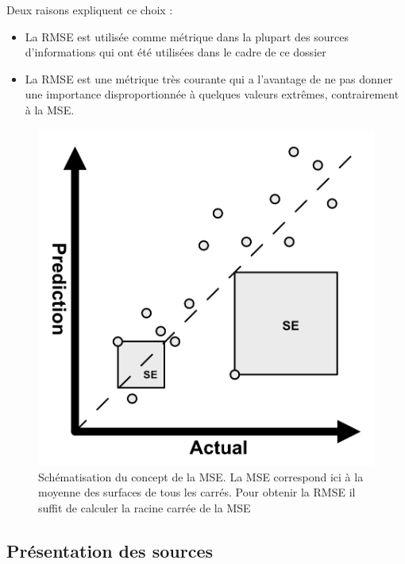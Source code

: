 \documentclass[french]{article}
\begin{document}
    Deux raisons expliquent ce choix :
    \begin{itemize}
        \item La RMSE est utilisée comme métrique dans la plupart des sources d'informations qui ont été utilisées dans le cadre de ce dossier
        \item La RMSE est une métrique très courante qui a l'avantage de ne pas donner une importance disproportionnée à quelques valeurs extrêmes, contrairement à la MSE.
    \end{itemize}

    \begin{figure}[h!]
        \includegraphics[width=12cm]{mse}
        \centering
        \caption{Schématisation du concept de la MSE. La MSE correspond ici à la moyenne des surfaces de tous les carrés. Pour obtenir la RMSE il suffit de calculer la racine carrée de la MSE}
        \centering
    \end{figure}

    \subsection{Présentation des sources}
\end{document}
